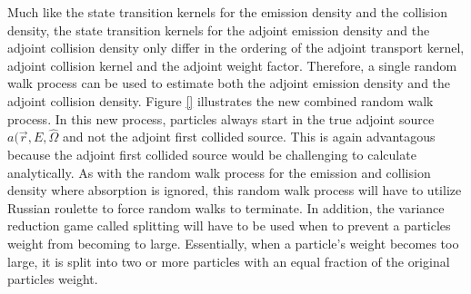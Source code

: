 Much like the state transition kernels for the emission density and the 
collision density, the state transition kernels for the adjoint emission 
density and the adjoint collision density only differ in the ordering of the
adjoint transport kernel, adjoint collision kernel and the adjoint weight
factor. Therefore, a single random walk process can be used to estimate both
the adjoint emission density and the adjoint collision density. Figure
\ref{} illustrates the new combined random walk process. In this new process,
particles always start in the true adjoint source $a(\vec{r},E,\hat{\Omega}$
and not the adjoint first collided source. This is again advantagous because
the adjoint first collided source would be challenging to calculate 
analytically. As with the random walk process for the emission and collision
density where absorption is ignored, this random walk process will have to
utilize Russian roulette to force random walks to terminate. In addition,
the variance reduction game called splitting will have to be used when
to prevent a particles weight from becoming to large. Essentially, when a 
particle's weight becomes too large, it is split into two or more particles with
an equal fraction of the original particles weight. 

